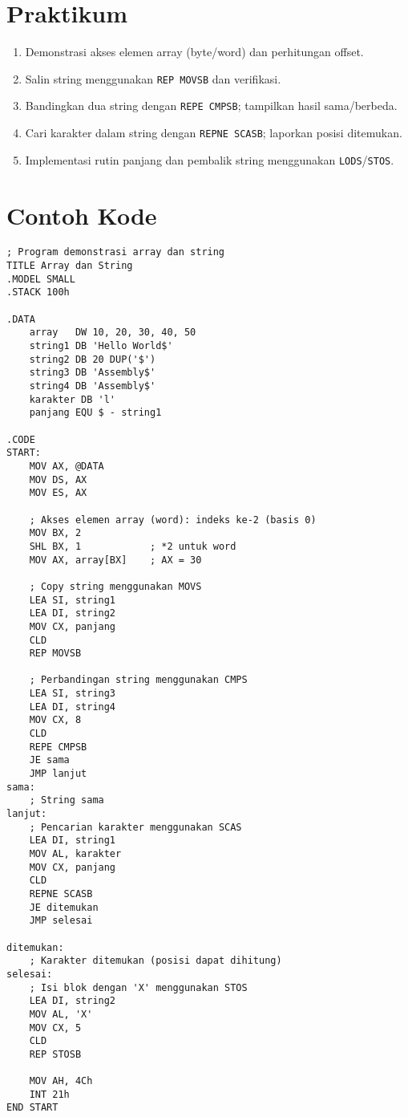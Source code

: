 \section{Praktikum}
\begin{enumerate}
  \item Demonstrasi akses elemen array (byte/word) dan perhitungan offset.
  \item Salin string menggunakan \texttt{REP MOVSB} dan verifikasi.
  \item Bandingkan dua string dengan \texttt{REPE CMPSB}; tampilkan hasil sama/berbeda.
  \item Cari karakter dalam string dengan \texttt{REPNE SCASB}; laporkan posisi ditemukan.
  \item Implementasi rutin panjang dan pembalik string menggunakan \texttt{LODS}/\texttt{STOS}.
\end{enumerate}

\section{Contoh Kode}
\begin{verbatim}
; Program demonstrasi array dan string
TITLE Array dan String
.MODEL SMALL
.STACK 100h

.DATA
    array   DW 10, 20, 30, 40, 50
    string1 DB 'Hello World$'
    string2 DB 20 DUP('$')
    string3 DB 'Assembly$'
    string4 DB 'Assembly$'
    karakter DB 'l'
    panjang EQU $ - string1

.CODE
START:
    MOV AX, @DATA
    MOV DS, AX
    MOV ES, AX
    
    ; Akses elemen array (word): indeks ke-2 (basis 0)
    MOV BX, 2
    SHL BX, 1            ; *2 untuk word
    MOV AX, array[BX]    ; AX = 30
    
    ; Copy string menggunakan MOVS
    LEA SI, string1
    LEA DI, string2
    MOV CX, panjang
    CLD
    REP MOVSB
    
    ; Perbandingan string menggunakan CMPS
    LEA SI, string3
    LEA DI, string4
    MOV CX, 8
    CLD
    REPE CMPSB
    JE sama
    JMP lanjut
sama:
    ; String sama
lanjut:
    ; Pencarian karakter menggunakan SCAS
    LEA DI, string1
    MOV AL, karakter
    MOV CX, panjang
    CLD
    REPNE SCASB
    JE ditemukan
    JMP selesai

ditemukan:
    ; Karakter ditemukan (posisi dapat dihitung)
selesai:
    ; Isi blok dengan 'X' menggunakan STOS
    LEA DI, string2
    MOV AL, 'X'
    MOV CX, 5
    CLD
    REP STOSB
    
    MOV AH, 4Ch
    INT 21h
END START
\end{verbatim}

